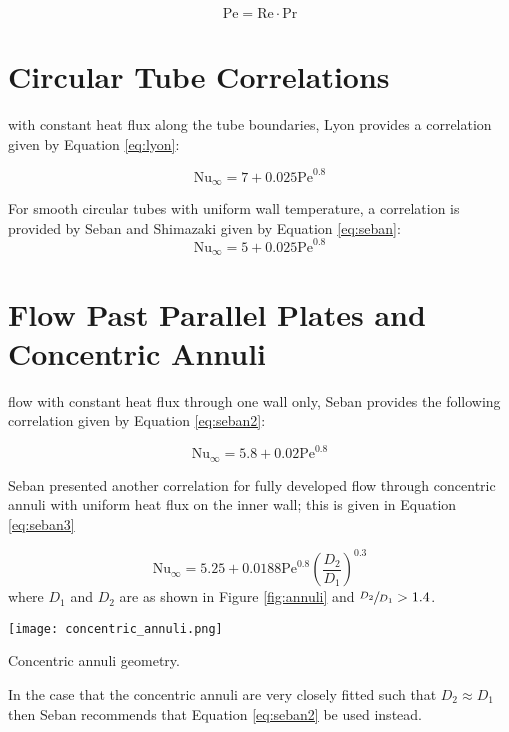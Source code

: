 \begin{equation}
\text{Pe} = \text{Re} \cdot \text{Pr}
\end{equation}


\section{Circular Tube Correlations}
 with constant heat flux along the tube boundaries, Lyon provides a correlation \cite{lyon1951liquid} given by Equation \ref{eq:lyon}: 

\begin{equation}
\text{Nu}_{\infty} = 7 + 0.025 \text{Pe}^{0.8}
\label{eq:lyon}
\end{equation}

For smooth circular tubes with uniform wall temperature, a correlation is provided by Seban and Shimazaki\cite{seban1949heat} given by Equation \ref{eq:seban}: 
\begin{equation}
\text{Nu}_{\infty} = 5 + 0.025 \text{Pe}^{0.8}
\label{eq:seban}
\end{equation}

\section{Flow Past Parallel Plates and Concentric Annuli}
 flow with constant heat flux through one wall only, Seban provides the following correlation\cite{seban1950heat} given by Equation \ref{eq:seban2}:  

\begin{equation}
\text{Nu}_{\infty} = 5.8 + 0.02 \text{Pe}^{0.8}
\label{eq:seban2}
\end{equation}

Seban presented another correlation for fully developed flow through concentric annuli with uniform heat flux on the inner wall; this is given in Equation \ref{eq:seban3} 

\begin{equation}
\text{Nu}_{\infty} = 5.25 + 0.0188\text{Pe}^{0.8}\left(\frac{D_2}{D_1} \right)^{0.3}
\label{eq:seban3}
\end{equation}
where $D_1$ and $D_2$ are as shown in Figure \ref{fig:annuli} and $\sfrac{D_2}{D_1} > 1.4$.
\begin{marginfigure}
\texttt{[image: concentric\_annuli.png]}
\caption{Concentric annuli geometry.}
\label{fig:annuli}
\end{marginfigure}
In the case that the concentric annuli are very closely fitted such that $D_2 \approx D_1$ then Seban recommends that Equation \ref{eq:seban2} be used instead.


